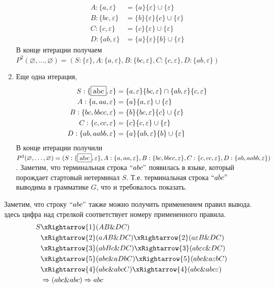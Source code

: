 \begin{example}
\begin{enumerate}
\begin{align*}
            A: \{a, \varepsilon\} &= \{a\}\{\varepsilon\} \cup \{\varepsilon\} \\ 
            B: \{bc, \varepsilon\} &= \{b\}\{\varepsilon\}\{c\} \cup \{\varepsilon\} \\
            C: \{c, \varepsilon\} &= \{c\}\{\varepsilon\} \cup \{\varepsilon\} \\ 
            D: \{ab, \varepsilon\} &= \{a\}\{\varepsilon\}\{b\} \cup \{\varepsilon\}
        \end{align*}
        В конце итерации получаем $P^{2}(\varnothing,\ldots,\varnothing) = (S: \{\varepsilon\}, A: \{a, \varepsilon\}, B: \{bc, \varepsilon\}, C: \{c, \varepsilon\}, D: \{ab, \varepsilon\})$
        \item Еще одна итерация,
        \begin{align*}
            S:  \{\fbox{abc}, \varepsilon\} &= \{a, \varepsilon\}\{bc, \varepsilon\} \cap \{ab, \varepsilon\}\{c, \varepsilon\} \\ 
            A: \{a, aa, \varepsilon\} &= \{a\}\{a, \varepsilon\} \cup \{\varepsilon\} \\ 
            B: \{bc, bbcc, \varepsilon\} &= \{b\}\{bc, \varepsilon\}\{c\} \cup \{\varepsilon\} \\
            C: \{c, cc, \varepsilon\} &= \{c\}\{c, \varepsilon\} \cup \{\varepsilon\} \\ 
            D: \{ab, aabb, \varepsilon\} &= \{a\}\{ab, \varepsilon\}\{b\} \cup \{\varepsilon\}
        \end{align*}
        В конце итерации получили $P^{3}(\varnothing,\ldots,\varnothing) = (S: \{\fbox{abc}, \varepsilon\}, A: \{a, aa, \varepsilon\}, B: \{bc, bbcc, \varepsilon\}, C: \{c, cc, \varepsilon\}, D: \{ab, aabb, \varepsilon\})$. Заметим, что терминальная строка $``abc"$ появилась в языке, который порождает стартовый нетерминал $S$. Т.е. терминальная строка $``abc"$ выводима в грамматике $G$, что и требовалось показать.
    \end{enumerate}
    
    Заметим, что строку $``abc"$ также можно получить применением правил вывода. здесь цифра над стрелкой соответствует номеру примененного правила. 
    \begin{align*}
        S &\xRightarrow{1}(AB\&DC) \\
        &\xRightarrow{2}(aAB\&DC) \xRightarrow{2} (a\varepsilon B\&DC) \\
        &\xRightarrow{3}(abBc\&DC) \xRightarrow{3}(ab\varepsilon c\&DC) \\
        &\xRightarrow{5}(abc\&aDbC) \xRightarrow{5}(abc\&a\varepsilon bC) \\
        &\xRightarrow{4}(abc\&abcC) \xRightarrow{4}(abc\&abc\varepsilon) \\
        &\Rightarrow(abc\&abc) \Rightarrow abc
    \end{align*}
\end{example}

